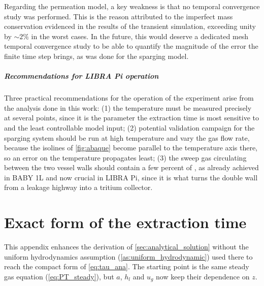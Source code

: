 \documentclass[a4paper,11pt,oneside]{report}
\newcounter{assumption}[chapter]
\begin{document}
Regarding the permeation model, a key weakness is that no temporal convergence study was performed. This is the reason attributed to the imperfect mass conservation evidenced in the results of the transient simulation, exceeding unity by $\sim 2\%$ in the worst cases. In the future, this would deserve a dedicated mesh temporal convergence study to be able to quantify the magnitude of the error the finite time step brings, as was done for the sparging model. 

\paragraph{Recommendations for LIBRA Pi operation}


Three practical recommendations for the operation of the experiment arise from the analysis done in this work: (1) the temperature must be measured precisely at several points, since it is the parameter the extraction time is most sensitive to and the least controllable model input; (2) potential validation campaign for the sparging system should be run at high temperature and vary the gas flow rate, because the isolines of \cref{fig:abaque} become parallel to the temperature axis there, so an error on the temperature propagates least; (3) the sweep gas circulating between the two vessel walls should contain a few percent of , as already achieved in BABY 1L and now crucial in LIBRA Pi, since it is what turns the double wall from a leakage highway into a tritium collector.


\cleardoublepage
{}
{}
\printbibliography

\appendix
\chapter{Exact form of the extraction time}
\label{app:tau_full}

This appendix enhances the derivation of \cref{sec:analytical_solution} without the uniform hydrodynamics assumption (\cref{as:uniform_hydrodynamic}) used there to reach the compact form of \cref{eq:tau_ana}. The starting point is the same steady gas equation (\cref{eq:PT_steady}), but $a$, $h_l$ and $u_g$ now keep their dependence on $z$.
\end{document}
